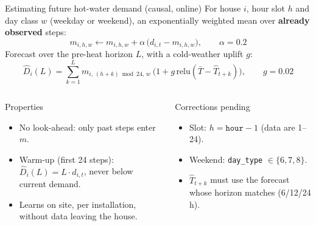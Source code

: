 \documentclass[aspectratio=169,10pt]{beamer}
\begin{document}
\begin{frame}{Estimating future hot-water demand (causal, online)}
For house $i$, hour slot $h$ and day class $w$ (weekday or weekend), an exponentially weighted mean over \textbf{already observed} steps:
\[
m_{i,h,w} \leftarrow m_{i,h,w} + \alpha\,\big(d_{i,t} - m_{i,h,w}\big), \qquad \alpha = 0.2
\]
Forecast over the pre-heat horizon $L$, with a cold-weather uplift $g$:
\[
\hat D_i(L) = \sum_{k=1}^{L} m_{i,\,(h+k) \bmod 24,\,w}\ \big(1 + g\,\mathrm{relu}(\bar T - \hat T_{t+k})\big), \qquad g = 0.02
\]
\begin{columns}[T]
\begin{block}{Properties}
\begin{itemize}
  \item No look-ahead: only past steps enter $m$.
  \item Warm-up (first 24 steps): $\hat D_i(L) = L\cdot d_{i,t}$, never below current demand.
  \item Learns on site, per installation, without data leaving the house.
\end{itemize}
\end{block}
\begin{alertblock}{Corrections pending}
\begin{itemize}
  \item Slot: $h = \texttt{hour} - 1$ (data are 1--24).
  \item Weekend: \texttt{day\_type} $\in \{6,7,8\}$.
  \item $\hat T_{t+k}$ must use the forecast whose horizon matches (6/12/24 h).
\end{itemize}
\end{alertblock}
\end{columns}
\end{frame}
\end{document}
